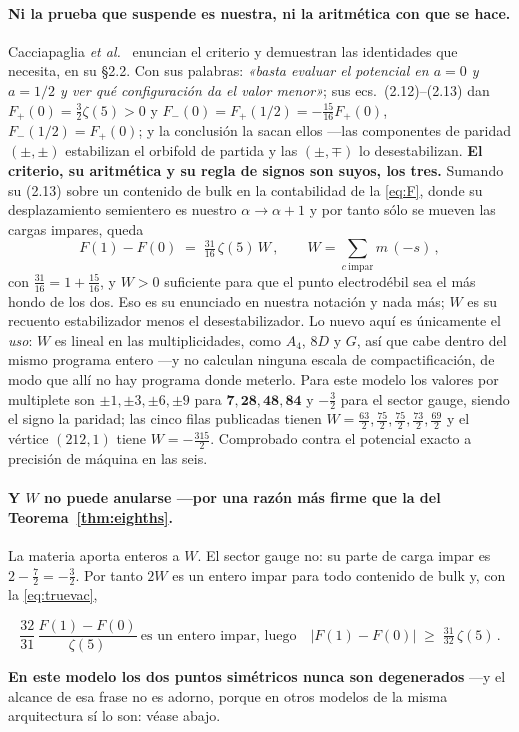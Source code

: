 \documentclass[11pt,a4paper]{article}
\newcommand{\rep}[1]{\mathbf{#1}}
\newenvironment{keyeq}
  {\begin{center}\setlength{\fboxsep}{9pt}\setlength{\fboxrule}{0.8pt}%
   \begin{lrbox}{\keyeqbox}\begin{minipage}{0.88\textwidth}}
  {\end{minipage}\end{lrbox}%
   \fcolorbox{hdrblue!55}{hdrblue!6}{\usebox{\keyeqbox}}\end{center}}
\begin{document}
\paragraph{Ni la prueba que suspende es nuestra, ni la aritmética con que se hace.} Cacciapaglia
\emph{et al.}~\cite{CCD24} enuncian el criterio y demuestran las identidades que necesita, en su
\S2.2. Con sus palabras: \emph{«basta evaluar el potencial en $a=0$ y $a=1/2$ y ver qué
configuración da el valor menor»}; sus ecs.~(2.12)--(2.13) dan $F_+(0)=\tfrac32\zeta(5)>0$ y
$F_-(0)=F_+(1/2)=-\tfrac{15}{16}F_+(0)$, $F_-(1/2)=F_+(0)$; y la conclusión la sacan ellos ---las
componentes de paridad $(\pm,\pm)$ estabilizan el orbifold de partida y las $(\pm,\mp)$ lo
desestabilizan. \textbf{El criterio, su aritmética y su regla de signos son suyos, los tres.}
Sumando su (2.13) sobre un contenido de bulk en la contabilidad de la \eqref{eq:F}, donde su
desplazamiento semientero es nuestro $\alpha\to\alpha+1$ y por tanto sólo se mueven las cargas
impares, queda
\begin{equation}\label{eq:truevac}
  F(1)-F(0)\;=\;\tfrac{31}{16}\,\zeta(5)\,W\,,\qquad W=\sum_{c\ \mathrm{impar}} m\,(-s)\,,
\end{equation}
con $\tfrac{31}{16}=1+\tfrac{15}{16}$, y $W>0$ suficiente para que el punto electrodébil sea el más
hondo de los dos. Eso es su enunciado en nuestra notación y nada más; $W$ es su recuento
estabilizador menos el desestabilizador. Lo nuevo aquí es únicamente el \emph{uso}: $W$ es lineal en
las multiplicidades, como $A_4$, $8D$ y $G$, así que cabe dentro del mismo programa entero ---y
\cite{CCD24} no calculan ninguna escala de compactificación, de modo que allí no hay programa donde
meterlo. Para este modelo los valores por multiplete son $\pm1,\pm3,\pm6,\pm9$ para
$\rep7,\rep{28},\rep{48},\rep{84}$ y $-\tfrac32$ para el sector gauge, siendo el signo la paridad;
las cinco filas publicadas tienen
$W=\tfrac{63}{2},\tfrac{75}{2},\tfrac{75}{2},\tfrac{73}{2},\tfrac{69}{2}$ y el vértice $(212,1)$
tiene $W=-\tfrac{315}{2}$. Comprobado
contra el potencial exacto a precisión de máquina en las seis.

\paragraph{Y $W$ no puede anularse ---por una razón más firme que la del
Teorema~\ref{thm:eighths}.} La materia aporta enteros a $W$. El sector gauge no: su parte de carga
impar es $2-\tfrac72=-\tfrac32$. Por tanto $2W$ es un entero impar para todo contenido de bulk y,
con la \eqref{eq:truevac},
\begin{keyeq}
\begin{equation}\label{eq:nevermarginal}
  \frac{32}{31}\,\frac{F(1)-F(0)}{\zeta(5)}\ \text{es un entero impar, luego}\quad
  |F(1)-F(0)|\;\ge\;\tfrac{31}{32}\,\zeta(5)\,.
\end{equation}
\end{keyeq}
\noindent \textbf{En este modelo los dos puntos simétricos nunca son degenerados} ---y el alcance de
esa frase no es adorno, porque en otros modelos de la misma arquitectura sí lo son: véase abajo.
\end{document}
